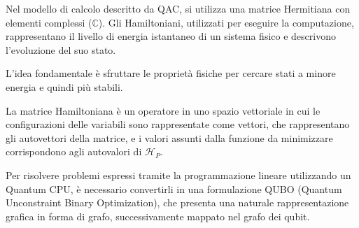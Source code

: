 \documentclass{article}
\begin{document}
Nel modello di calcolo descritto da QAC, si utilizza una matrice Hermitiana con elementi complessi ($\mathbb{C}$). Gli Hamiltoniani, utilizzati per eseguire la computazione, rappresentano il livello di energia istantaneo di un sistema fisico e descrivono l'evoluzione del suo stato.

L'idea fondamentale è sfruttare le proprietà fisiche per cercare stati a minore energia e quindi più stabili.

La matrice Hamiltoniana è un operatore in uno spazio vettoriale in cui le configurazioni delle variabili sono rappresentate come vettori, che rappresentano gli autovettori della matrice, e i valori assunti dalla funzione da minimizzare corrispondono agli autovalori di $\mathcal{H}_P$. 

Per risolvere problemi espressi tramite la programmazione lineare utilizzando un Quantum CPU, è necessario convertirli in una formulazione QUBO (Quantum Unconstraint Binary Optimization), che presenta una naturale rappresentazione grafica in forma di grafo, successivamente mappato nel grafo dei qubit.
\end{document}
